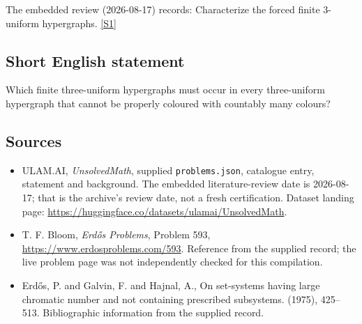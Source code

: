 \documentclass[11pt,a4paper]{article}
\newcommand{\sref}[2]{\hyperlink{source:#1:#2}{[S#2]}}
\begin{document}
The embedded review (2026-08-17) records: Characterize the forced finite 3-uniform hypergraphs. \sref{statement}{1}

\subsection{Short English statement}

Which finite three-uniform hypergraphs must occur in every three-uniform hypergraph that cannot be properly coloured with countably many colours?

\subsection{Sources}

{\small

\begin{itemize}

\item[\hypertarget{source:statement:1}{S1}] ULAM.AI, \emph{UnsolvedMath}, supplied \texttt{problems.json}, catalogue entry, statement and background. The embedded literature-review date is 2026-08-17; that is the archive’s review date, not a fresh certification. Dataset landing page: \url{https://huggingface.co/datasets/ulamai/UnsolvedMath}.

\item[\hypertarget{source:statement:2}{S2}] T. F. Bloom, \emph{Erdős Problems}, Problem 593, \url{https://www.erdosproblems.com/593}. Reference from the supplied record; the live problem page was not independently checked for this compilation.

\item[\hypertarget{source:statement:3}{S3}] Erd\H{o}s, P. and Galvin, F. and Hajnal, A., On set-systems having large chromatic number and not containing prescribed subsystems. (1975), 425--513. Bibliographic information from the supplied record.

\end{itemize}

}

\label{end:statement}
\end{document}
